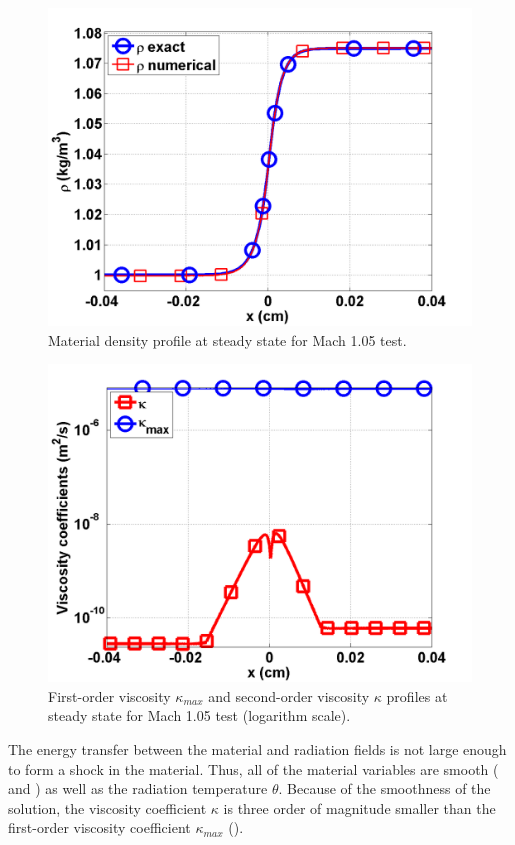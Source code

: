 \begin{figure}[H]
                \centering
                \includegraphics[width=\textwidth]{figures/Mach_1p05_nel_500_density}
        \caption{Material density profile at steady state for Mach 1.05 test.}\label{fig:Mach105_density}
\end{figure}
\begin{figure}[H]
                \centering
                \includegraphics[width=\textwidth]{figures/Mach_1p05_nel_500_viscosity.png}
        \caption{First-order viscosity $\kappa_{max}$ and second-order viscosity $\kappa$ profiles at steady state for Mach 1.05 test (logarithm scale).}\label{fig:Mach105_viscosity}
\end{figure}
The energy transfer between the material and radiation fields is not large enough to form a shock in the material. Thus, all of the material variables are smooth ( and ) as well as the radiation temperature $\theta$. Because of the smoothness of the solution, the viscosity coefficient $\kappa$ is three order of magnitude smaller than the first-order viscosity coefficient $\kappa_{max}$ ().

